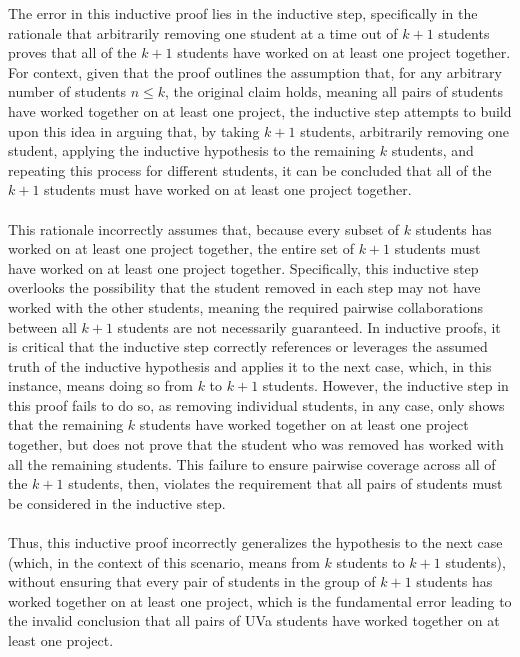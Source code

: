 \documentclass[12pt]{article}
\begin{document}
The error in this inductive proof lies in the inductive step, specifically in the rationale that arbitrarily removing one student at a time out of $k+1$ students proves that all of the $k+1$ students have worked on at least one project together. For context, given that the proof outlines the assumption that, for any arbitrary number of students $n \leq k$, the original claim holds, meaning all pairs of students have worked together on at least one project, the inductive step attempts to build upon this idea in arguing that, by taking $k+1$ students,  arbitrarily removing one student, applying the inductive hypothesis to the remaining $k$ students, and repeating this process for different students, it can be concluded that all of the $k+1$ students must have worked on at least one project together.\\
\\
This rationale incorrectly assumes that, because every subset of $k$ students has worked on at least one project together, the entire set of $k+1$ students must have worked on at least one project together. Specifically, this inductive step overlooks the possibility that the  student removed in each step may not have worked with the other students, meaning the required pairwise collaborations between all $k+1$ students are not necessarily guaranteed. In inductive proofs, it is critical that the inductive step correctly references or leverages the assumed truth of the inductive hypothesis and applies it to the next case, which, in this instance, means doing so from $k$ to $k+1$ students. However, the inductive step in this proof fails to do so, as removing individual students, in any case, only shows that the remaining $k$ students have worked together on at least one project together, but does not prove that the student who was removed has worked with all the remaining students. This failure to ensure pairwise coverage across all of the $k+1$ students, then, violates the requirement that all pairs of students must be considered in the inductive step.\\
\\
Thus, this inductive proof incorrectly generalizes the hypothesis to the next case (which, in the context of this scenario, means from $k$ students to $k+1$ students), without ensuring that every pair of students in the group of $k+1$ students has worked together on at least one project, which is the fundamental error leading to the invalid conclusion that all pairs of UVa students have worked together on at least one project.
\end{document}
